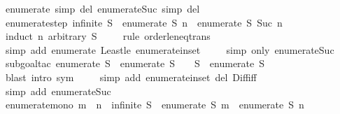 \begin{isabellebody}
\ enumerate{\isacharunderscore}{}\ {\isacharbrackleft}simp\ del{\isacharbrackright}\ enumerate{\isacharunderscore}Suc\ {\isacharbrackleft}simp\ del{\isacharbrackright}\isanewline
\isanewline
{}\isamarkupfalse%
\ enumerate{\isacharunderscore}step{\isacharcolon}\ {\isachardoublequoteopen}infinite\ S\ {\isasymLongrightarrow}\ enumerate\ S\ n\ {\isacharless}\ enumerate\ S\ {\isacharparenleft}Suc\ n{\isacharparenright}{\isachardoublequoteclose}\isanewline
%
\isadelimproof
\ \ %
\endisadelimproof
%
\isatagproof
{}\isamarkupfalse%
\ {\isacharparenleft}induct\ n\ arbitrary{\isacharcolon}\ S{\isacharparenright}\isanewline
\ \ \ \isamarkupfalse%
\ {\isacharparenleft}rule\ order{\isacharunderscore}le{\isacharunderscore}neq{\isacharunderscore}trans{\isacharparenright}\isanewline
\ \ \ \ \isamarkupfalse%
\ {\isacharparenleft}simp\ add{\isacharcolon}\ enumerate{\isacharunderscore}{}\ Least{\isacharunderscore}le\ enumerate{\isacharunderscore}in{\isacharunderscore}set{\isacharparenright}\isanewline
\ \ \ \isamarkupfalse%
\ {\isacharparenleft}simp\ only{\isacharcolon}\ enumerate{\isacharunderscore}Suc{\isacharprime}{\isacharparenright}\isanewline
\ \ \ \isamarkupfalse%
\ {\isacharparenleft}subgoal{\isacharunderscore}tac\ {\isachardoublequoteopen}enumerate\ {\isacharparenleft}S\ {\isacharminus}\ {\isacharbraceleft}enumerate\ S\ {}{\isacharbraceright}{\isacharparenright}\ {}\ {\isasymin}\ S\ {\isacharminus}\ {\isacharbraceleft}enumerate\ S\ {}{\isacharbraceright}{\isachardoublequoteclose}{\isacharparenright}\isanewline
\ \ \ \ \isamarkupfalse%
\ {\isacharparenleft}blast\ intro{\isacharcolon}\ sym{\isacharparenright}\isanewline
\ \ \ \isamarkupfalse%
\ {\isacharparenleft}simp\ add{\isacharcolon}\ enumerate{\isacharunderscore}in{\isacharunderscore}set\ del{\isacharcolon}\ Diff{\isacharunderscore}iff{\isacharparenright}\isanewline
\ \ \isamarkupfalse%
\ {\isacharparenleft}simp\ add{\isacharcolon}\ enumerate{\isacharunderscore}Suc{\isacharprime}{\isacharparenright}\isanewline
\ \ \isamarkupfalse%
%
\endisatagproof
{\isafoldproof}%
%
\isadelimproof
\isanewline
%
\endisadelimproof
\isanewline
{}\isamarkupfalse%
\ enumerate{\isacharunderscore}mono{\isacharcolon}\ {\isachardoublequoteopen}m\ {\isacharless}\ n\ {\isasymLongrightarrow}\ infinite\ S\ {\isasymLongrightarrow}\ enumerate\ S\ m\ {\isacharless}\ enumerate\ S\ n{\isachardoublequoteclose}\isanewline

\end{isabellebody}

